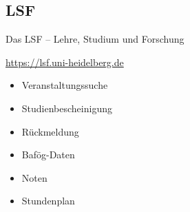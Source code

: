 \subsection{LSF}
\begin{frame}{Das LSF -- Lehre, Studium und Forschung}

    \large \url{https://lsf.uni-heidelberg.de} \\
    \begin{minipage}[t]{0.515\textwidth}
        \begin{itemize}
            \item{Veranstaltungssuche}
            \item{Studienbescheinigung}
            \item{Rückmeldung}
            \item{Bafög-Daten}
            \item{Noten}
            \item{Stundenplan}
        \end{itemize}
    \end{minipage}
    \begin{minipage}[t]{0.4\textwidth}
        \vspace{0.4cm}
        \begin{center}
        \end{center}
    \end{minipage}
\end{frame}

